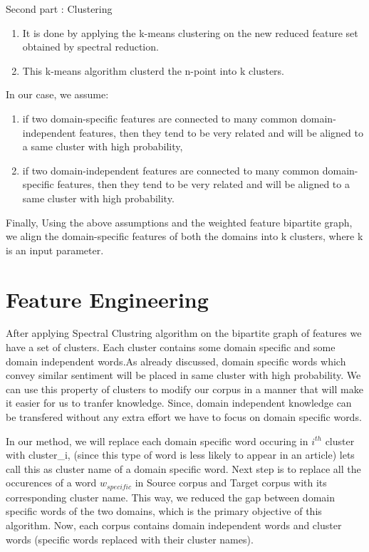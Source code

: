 \documentclass{report}
\begin{document}
Second part : Clustering
\begin{enumerate}[label=\alph*).]
\item It is done by applying the k-means clustering on the new reduced feature set obtained by spectral reduction.
\item This k-means algorithm clusterd the n-point into k clusters. 
\end{enumerate}
In our case, we assume:\\
\begin{enumerate}[label=\arabic*.]
\item if two domain-specific features are connected to many common domain- independent features, then they tend to be very related and will be aligned to a same cluster with high probability,
\item if two domain-independent features are connected to many common domain-specific features, then they tend to be very related and will be aligned to a same cluster with high probability.
\end{enumerate}
Finally, Using the above assumptions and the weighted feature bipartite graph, we align the domain-specific features of both the domains into k clusters, where k is an input parameter.

\section{Feature Engineering}

After applying Spectral Clustring algorithm on the bipartite graph of features we have a set of clusters. Each cluster contains some domain specific and some domain independent words.As already discussed, domain specific words which convey similar sentiment will be placed in same cluster with high probability. We can use this property of clusters to modify our corpus in a manner that will make it easier for us to tranfer knowledge.
Since,  domain independent knowledge can be transfered without any extra effort we have to focus on domain specific words.

In our method, we will replace each domain specific word occuring in \(i^{th}\) cluster with cluster\_i, (since this type of word is less likely to appear in an article) let\textquotesingle s call this as cluster name of a domain specific word. Next step is to replace all the occurences of a word \(w_{specific}\) in Source corpus and Target corpus with its corresponding cluster name. This way, we reduced the gap between domain specific words of the two domains, which is the primary objective of this algorithm. Now, each corpus contains domain independent words and cluster words (specific words replaced with their cluster names).
\end{document}
